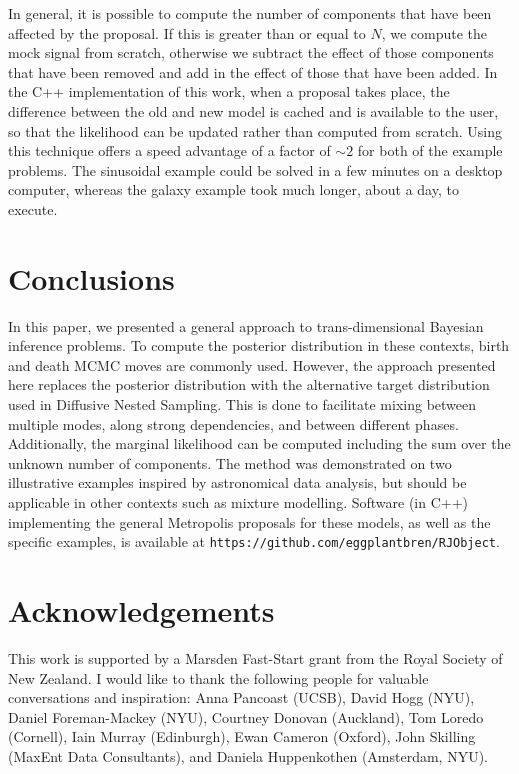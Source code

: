 \documentclass[letterpaper, 11pt]{article}
\begin{document}
In general, it is possible to compute the number of components that have been
affected by the proposal. If this is greater than or equal to $N$, we compute
the mock signal from scratch, otherwise we subtract the effect of those
components that have been removed and add in the effect of those that have been
added. In the C++ implementation of this work, when a proposal takes
place, the difference between the old and new model is cached and is available
to the user, so that the likelihood can be updated rather than computed
from scratch. Using this technique offers a speed advantage of a factor of
$\sim 2$ for both of the example problems. The sinusoidal example could be
solved in a few minutes on a desktop computer, whereas the galaxy example took
much longer, about a day, to execute.

\section{Conclusions}
In this paper, we presented a general approach to trans-dimensional Bayesian
inference problems. To compute the posterior distribution in these contexts,
birth and death MCMC moves are commonly used. However, the approach presented
here replaces the posterior distribution with the alternative target
distribution used in Diffusive Nested Sampling. This is done to facilitate
mixing between multiple modes, along strong dependencies,
and between different phases. Additionally,
the marginal likelihood can be computed including the sum over the unknown
number of components. The method was demonstrated on two illustrative examples
inspired by astronomical data analysis, but should be applicable in other
contexts such as mixture modelling. Software (in C++) implementing the
general Metropolis proposals for these models, as well as the specific
examples, is available at {\tt https://github.com/eggplantbren/RJObject}.

\section*{Acknowledgements}
This work is supported by a Marsden Fast-Start grant
from the Royal Society of New Zealand. I would like to thank the following
people for valuable conversations and inspiration:
Anna Pancoast (UCSB), David Hogg (NYU), Daniel Foreman-Mackey (NYU),
Courtney Donovan (Auckland), Tom Loredo (Cornell), Iain Murray (Edinburgh),
Ewan Cameron (Oxford),
John Skilling (MaxEnt Data Consultants), and Daniela Huppenkothen
(Amsterdam, NYU).
\end{document}
